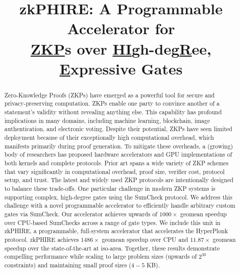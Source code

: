 \documentclass[10pt,conference]{IEEEtran}
\title{zkPHIRE: A Programmable Accelerator for \\ \underline{Z}\underline{K}\underline{P}s over \underline{HI}gh-deg\underline{R}ee, \underline{E}xpressive Gates}
\def\hpcacameraready{} %
\begin{document}


\maketitle

\ifdefined\hpcacameraready 
  \thispagestyle{camerareadyfirstpage}
  \pagestyle{empty}
\else
  \thispagestyle{plain}
  \pagestyle{plain}
\fi

\newcommand{\hpcaheight}{0mm}
\ifdefined\eaopen
\renewcommand{\hpcaheight}{12mm}
\fi
  
\begin{abstract}
Zero-Knowledge Proofs (ZKPs) have emerged as a powerful tool for secure and privacy-preserving computation. ZKPs enable one party to convince another of a statement’s validity without revealing anything else. This capability has profound implications in many domains, including machine learning, blockchain, image authentication, and electronic voting. Despite their potential, ZKPs have seen limited deployment because of their exceptionally high computational overhead, which manifests primarily during proof generation. To mitigate these overheads, a (growing) body of researchers has proposed hardware accelerators and GPU implementations of both kernels and complete protocols. Prior art spans a wide variety of ZKP schemes that vary significantly in computational overhead, proof size, verifier cost, protocol setup, and trust. The latest and widely used ZKP protocols are intentionally designed to balance these trade-offs.
One particular challenge in modern ZKP systems is supporting complex, high-degree gates using the SumCheck protocol. We address this challenge with a novel programmable accelerator to efficiently handle arbitrary custom gates via SumCheck. Our accelerator achieves upwards of $1000\times$ geomean speedup over CPU-based SumChecks across a range of gate types. We include this unit in zkPHIRE, a programmable, full-system accelerator that accelerates the HyperPlonk protocol. zkPHIRE achieves $1486\times$ geomean speedup over CPU and $11.87\times$ geomean speedup over the state-of-the-art at iso-area. 
Together, these results demonstrate compelling performance while scaling to large problem sizes (upwards of $2^{30}$ constraints) and maintaining small proof sizes ($4-5$ KB).

\end{abstract}
\end{document}
